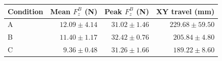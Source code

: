 \begin{tabular}{lrrr}
\toprule
Condition & Mean $F_z^B$ (N) & Peak $F_z^B$ (N) & XY travel (mm) \\
\midrule
A & $12.09 \pm 4.14$ & $31.02 \pm 1.46$ & $229.68 \pm 59.50$ \\
B & $11.40 \pm 1.17$ & $32.42 \pm 0.76$ & $205.84 \pm 4.80$ \\
C & $9.36 \pm 0.48$ & $31.26 \pm 1.66$ & $189.22 \pm 8.60$ \\
\bottomrule
\end{tabular}
